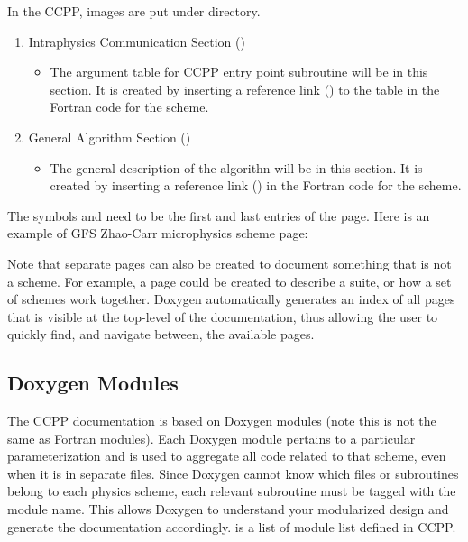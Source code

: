\documentclass[letterpaper,10pt,english]{sphinxmanual}
\begin{document}
In the CCPP, images are put under  directory.
\begin{enumerate}
\def\theenumi{\alph{enumi}}
\def\labelenumi{\theenumi .}
\makeatletter\def\p@enumii{\p@enumi \theenumi .}\makeatother
\setcounter{enumi}{1}
\item {} 
Intraphysics Communication Section ()
\begin{itemize}
\item {} 
The argument table for CCPP entry point subroutine  will be in this section.
It is created by inserting a reference link () to the table in the Fortran code
for the scheme.

\end{itemize}

\item {} 
General Algorithm Section ()
\begin{itemize}
\item {} 
The general description of the algorithn will be in this section.  It is created by inserting
a reference link () in the Fortran code for the scheme.

\end{itemize}

\end{enumerate}

The symbols  and  need to be the first and last entries of the page.
Here is an example of GFS Zhao-Carr microphysics scheme page:

Note that separate pages can also be created to document something that is not a scheme.
For example, a page could be created to describe a suite, or how a set of schemes work
together.  Doxygen automatically generates an index of all pages that is visible at the
top-level of the documentation, thus allowing the user to quickly find, and navigate
between, the available pages.


\subsection{Doxygen Modules}
\label{\detokenize{ScientificDocRules:doxygen-modules}}
The CCPP documentation is based on Doxygen modules (note this is not the same as
Fortran modules). Each Doxygen module pertains to a particular parameterization and
is used to aggregate all code related to that scheme, even when it is in separate
files. Since Doxygen cannot know which files or subroutines belong to each physics
scheme, each relevant subroutine must be tagged with the module name. This allows
Doxygen to understand your modularized design and generate the documentation accordingly.
is a list of module list defined in CCPP.
\end{document}
